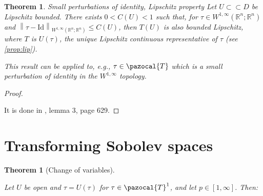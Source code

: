 \documentclass[english,a4paper,9pt,oneside]{scrbook}	%
\theoremstyle{break}
\newtheorem{thm}[equation]{Theorem}
\newtheorem{prop}[equation]{Proposition}
\newenvironment{mproof}[1][\proofname]{%
  \begin{proof}[#1]$ $\par\nobreak\ignorespaces
}{%
  \end{proof}
}
\renewcommand*{\proofname}{Proof}
\theoremstyle{remark}
\newcommand{\mR}{\mathbb{R}}
\newcommand{\norm}[1]{\left\lVert#1\right\rVert}
\newcommand{\cc}{\subset\subset}
\newcommand{\cT}{\pazocal{T}}
\newcommand{\id}{\text{Id}}
\newcommand{\te}{\theta}
\newcommand{\Te}{\Theta}
\begin{document}
\begin{appendices}
\begin{thm}{Small perturbations of identity, Lipschitz property}
\label{thm:ptb_id_lip}
Let $U\cc D$ be Lipschitz bounded. There exists $0<C(U)<1$ such that, for $\tau \in W^{1,\infty}(\mR^n;\mR^n)$ and $\norm{\tau - \id}_{W^{1,\infty}(\mR^n;\mR^n)}\leq C(U)$, then $T(U)$ is also bounded Lipschitz, where $T$ is $U(\tau)$, the unique Lipschitz continuous representative of $\tau$ (see \cref{prop:lip}).

This result can be applied to, e.g., $\tau \in \cT$ which is a small perturbation of identity in the $W^{1,\infty}$ topology.
\end{thm}

\begin{mproof}
It is done in \cite{bello}, lemma 3, page 629.
\end{mproof}

%
%
%
%
%
%
%
%
%
%
%

\section{Transforming Sobolev spaces}

\begin{thm}[Change of variables]
\label{thm:change}

Let $U$ be open and $\tau = U(\tau)$ for $\tau \in \cT^1$, and let $p \in [ 1,\infty]$. Then:


\end{thm}
\end{appendices}
\end{document}
